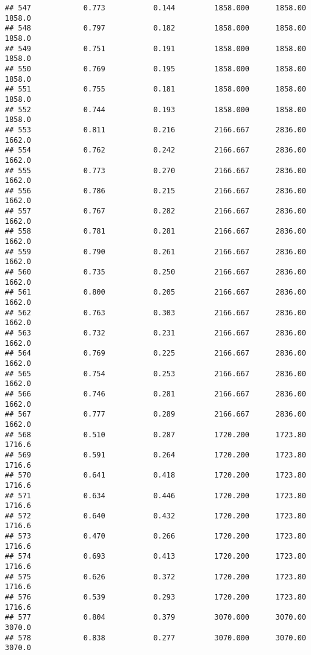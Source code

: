 \documentclass[
]{article}
\begin{document}
\begin{verbatim}
## 547            0.773           0.144         1858.000      1858.00       1858.0
## 548            0.797           0.182         1858.000      1858.00       1858.0
## 549            0.751           0.191         1858.000      1858.00       1858.0
## 550            0.769           0.195         1858.000      1858.00       1858.0
## 551            0.755           0.181         1858.000      1858.00       1858.0
## 552            0.744           0.193         1858.000      1858.00       1858.0
## 553            0.811           0.216         2166.667      2836.00       1662.0
## 554            0.762           0.242         2166.667      2836.00       1662.0
## 555            0.773           0.270         2166.667      2836.00       1662.0
## 556            0.786           0.215         2166.667      2836.00       1662.0
## 557            0.767           0.282         2166.667      2836.00       1662.0
## 558            0.781           0.281         2166.667      2836.00       1662.0
## 559            0.790           0.261         2166.667      2836.00       1662.0
## 560            0.735           0.250         2166.667      2836.00       1662.0
## 561            0.800           0.205         2166.667      2836.00       1662.0
## 562            0.763           0.303         2166.667      2836.00       1662.0
## 563            0.732           0.231         2166.667      2836.00       1662.0
## 564            0.769           0.225         2166.667      2836.00       1662.0
## 565            0.754           0.253         2166.667      2836.00       1662.0
## 566            0.746           0.281         2166.667      2836.00       1662.0
## 567            0.777           0.289         2166.667      2836.00       1662.0
## 568            0.510           0.287         1720.200      1723.80       1716.6
## 569            0.591           0.264         1720.200      1723.80       1716.6
## 570            0.641           0.418         1720.200      1723.80       1716.6
## 571            0.634           0.446         1720.200      1723.80       1716.6
## 572            0.640           0.432         1720.200      1723.80       1716.6
## 573            0.470           0.266         1720.200      1723.80       1716.6
## 574            0.693           0.413         1720.200      1723.80       1716.6
## 575            0.626           0.372         1720.200      1723.80       1716.6
## 576            0.539           0.293         1720.200      1723.80       1716.6
## 577            0.804           0.379         3070.000      3070.00       3070.0
## 578            0.838           0.277         3070.000      3070.00       3070.0

\end{verbatim}
\end{document}
